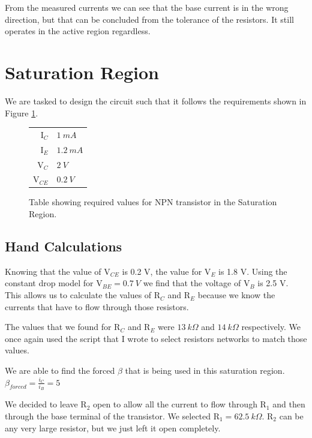 \documentclass{article}
\begin{document}
From the measured currents we can see that the base
current is in the wrong direction, but that can
be concluded from the tolerance of the resistors. It
still operates in the active region regardless.

% 
% 
\newpage
% 
% 
% 

\section{Saturation Region}
We are tasked to design the circuit such that
it follows the requirements shown in Figure
\ref{table:satTable}.

\begin{figure}[h!]
\begin{center}
  \begin{tabular}{r|l}
    I$_C$ & $\SI{1}{mA}$ \\
    I$_E$ & $\SI{1.2}{mA}$ \\
    V$_C$ & $\SI{2}{V}$ \\
    V$_{CE}$ & $\SI{0.2}{V}$ \\
  \end{tabular}
\end{center}
\caption{Table showing required values for NPN transistor
in the Saturation Region.}
\label{table:satTable}
\end{figure}

\subsection{Hand Calculations}

Knowing that the value of V$_{CE}$ is 0.2 V, the
value for V$_E$ is 1.8 V. Using the constant drop 
model for V$_{BE}=\SI{0.7}{V}$ we find that the
voltage of V$_B$ is 2.5 V. This allows us to calculate
the values of R$_C$ and R$_E$ because we know
the currents that have to flow through those resistors.

The values that we found for R$_C$ and R$_E$ were 
$\SI{13}{k \Omega}$ and $\SI{14}{k \Omega}$ respectively.
We once again used the script that I wrote to select
resistors networks to match those values.

We are able to find the forced $\beta$ that is being
used in this saturation region.
$\beta_{forced}=\frac{i_C}{i_B}=5$

We decided to leave R$_2$ open to allow all the current
to flow through R$_1$ and then through the base terminal
of the transistor. We selected R$_1=\SI{62.5}{k \Omega}$.
R$_2$ can be any very large resistor, but we just left
it open completely.
\end{document}
